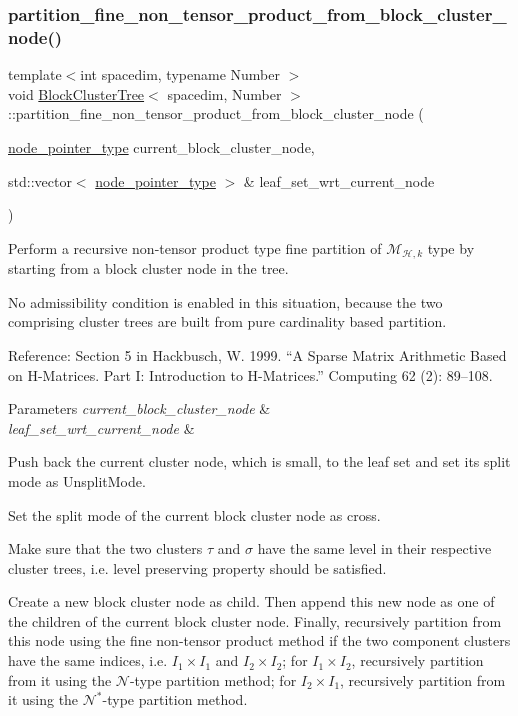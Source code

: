 \subsubsection{\texorpdfstring{partition\+\_\+fine\+\_\+non\+\_\+tensor\+\_\+product\+\_\+from\+\_\+block\+\_\+cluster\+\_\+node()}{partition\_fine\_non\_tensor\_product\_from\_block\_cluster\_node()}}
{\footnotesize\ttfamily template$<$int spacedim, typename Number $>$ \\
void \hyperlink{classBlockClusterTree}{Block\+Cluster\+Tree}$<$ spacedim, Number $>$\+::partition\+\_\+fine\+\_\+non\+\_\+tensor\+\_\+product\+\_\+from\+\_\+block\+\_\+cluster\+\_\+node (\begin{DoxyParamCaption}\item[{\hyperlink{classTreeNode}{node\+\_\+pointer\+\_\+type}}]{current\+\_\+block\+\_\+cluster\+\_\+node,  }\item[{std\+::vector$<$ \hyperlink{classTreeNode}{node\+\_\+pointer\+\_\+type} $>$ \&}]{leaf\+\_\+set\+\_\+wrt\+\_\+current\+\_\+node }\end{DoxyParamCaption})\hspace{0.3cm}{\ttfamily [private]}}

Perform a recursive non-\/tensor product type fine partition of $\mathcal{M}_{\mathcal{H},k}$ type by starting from a block cluster node in the tree.

No admissibility condition is enabled in this situation, because the two comprising cluster trees are built from pure cardinality based partition.

Reference\+: Section 5 in Hackbusch, W. 1999. “A Sparse Matrix Arithmetic Based on H-\/\+Matrices. Part I\+: Introduction to H-\/\+Matrices.” Computing 62 (2)\+: 89–108. 
\begin{DoxyParams}{Parameters}
{\em current\+\_\+block\+\_\+cluster\+\_\+node} & \\
\hline
{\em leaf\+\_\+set\+\_\+wrt\+\_\+current\+\_\+node} & \\
\hline
\end{DoxyParams}
Push back the current cluster node, which is small, to the leaf set and set its split mode as {\ttfamily Unsplit\+Mode}.

Set the split mode of the current block cluster node as cross.

Make sure that the two clusters $\tau$ and $\sigma$ have the same level in their respective cluster trees, i.\+e. level preserving property should be satisfied.

Create a new block cluster node as child. Then append this new node as one of the children of the current block cluster node. Finally, recursively partition from this node using the fine non-\/tensor product method if the two component clusters have the same indices, i.\+e. $I_1 \times I_1$ and $I_2 \times I_2$; for $I_1 \times I_2$, recursively partition from it using the $\mathcal{N}$-\/type partition method; for $I_2 \times I_1$, recursively partition from it using the $\mathcal{N}^*$-\/type partition method.

